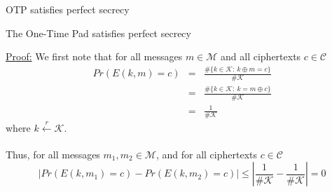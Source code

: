 \documentclass[aspectratio=169, lualatex, handout, 10pt,dvipsnames,svgnames]{beamer} %
\newcommand{\Ccal}{\mathcal{C}}
\newcommand{\Kcal}{\mathcal{K}}
\newcommand{\Mcal}{\mathcal{M}}
\begin{document}
\begin{frame}{OTP satisfies perfect secrecy}
    \vspace{-0.5cm}
  \begin{theorem}[Shannon 1949]
    The One-Time Pad satisfies perfect secrecy
  \end{theorem}

  \underline{Proof:} We first note that for all messages $m\in\Mcal$ and all ciphertexts $c\in\Ccal$
  \[
  \begin{array}{lcl}
    Pr(E(k, m) = c) & {=} & {\frac{\#\{k\in\Kcal:\ k\oplus m = c\}}{\#\Kcal}} \\[0.2cm]
                    & {=} & {\frac{\#\{k\in\Kcal:\ k = m\oplus c\}}{\#\Kcal}} \\[0.2cm]
                    & {=} & {\frac{1}{\#\Kcal}}
  \end{array}
  \]
  {where $k \xleftarrow[]{r} \Kcal$.}

  {Thus, for all messages $m_1, m_2\in\Mcal$, and for all ciphertexts $c\in\Ccal$}
  \[
    {\left| Pr(E(k, m_1) = c) - Pr(E(k, m_2) = c)
      \right| \le} {\left|\frac{1}{\#\Kcal} - \frac{1}{\#\Kcal}\right| = 0}
  \]

  
\end{frame}
\end{document}
